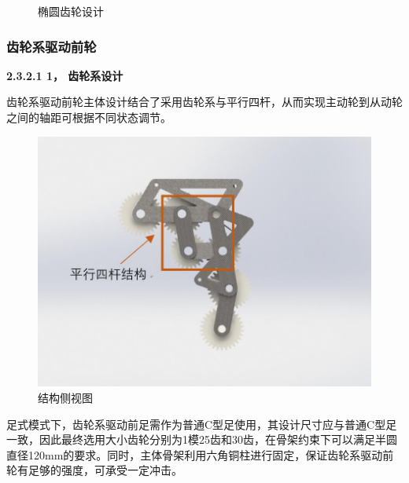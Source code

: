 \documentclass[12pt]{article}
\begin{document}
\begin{CJK}{UTF8}{song}
\begin{figure}[H]
{%
}
\quad
{}
\quad
\caption{椭圆齿轮设计}
\end{figure}
\subsubsection{齿轮系驱动前轮}
\textbf{2.3.2.1 1，	齿轮系设计}\par
 齿轮系驱动前轮主体设计结合了采用齿轮系与平行四杆，从而实现主动轮到从动轮之间的轴距可根据不同状态调节。
 \begin{figure}[H]
\centering
\includegraphics[width=.6\textwidth]{chap2//figc.jpg}
\caption{结构侧视图}
\end{figure}
足式模式下，齿轮系驱动前足需作为普通C型足使用，其设计尺寸应与普通C型足一致，因此最终选用大小齿轮分别为1模25齿和30齿，在骨架约束下可以满足半圆直径120mm的要求。同时，主体骨架利用六角铜柱进行固定，保证齿轮系驱动前轮有足够的强度，可承受一定冲击。
 \begin{figure}[H]
{}
\end{figure}
\end{CJK}
\end{document}
